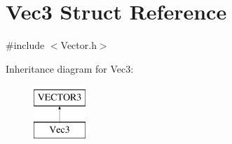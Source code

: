 \hypertarget{struct_vec3}{
\section{Vec3 Struct Reference}
\label{struct_vec3}
}


{\ttfamily \#include $<$Vector.h$>$}

Inheritance diagram for Vec3:\begin{figure}[H]
\begin{center}
\leavevmode
\includegraphics[height=2.000000cm]{struct_vec3}
\end{center}
\end{figure}
